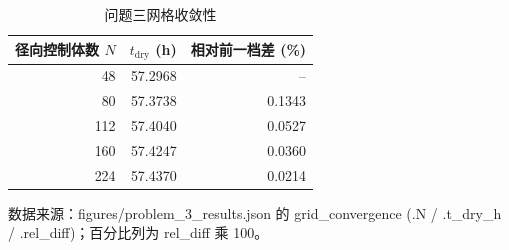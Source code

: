 \begin{table}[H]
  \centering
  \caption{问题三网格收敛性}
  \label{tab:grid}
  \begin{tabular}{rrr}
    \toprule
    径向控制体数 $N$ & $t_{\mathrm{dry}}$ (h) & 相对前一档差 (\%) \\
    \midrule
    48 & 57.2968 & -- \\
    80 & 57.3738 & 0.1343 \\
    112 & 57.4040 & 0.0527 \\
    160 & 57.4247 & 0.0360 \\
    224 & 57.4370 & 0.0214 \\
    \bottomrule
  \end{tabular}
  \par\vspace{2pt}\footnotesize 数据来源：figures/problem\_3\_results.json 的 grid\_convergence (.N / .t\_dry\_h / .rel\_diff)；百分比列为 rel\_diff 乘 100。
\end{table}
